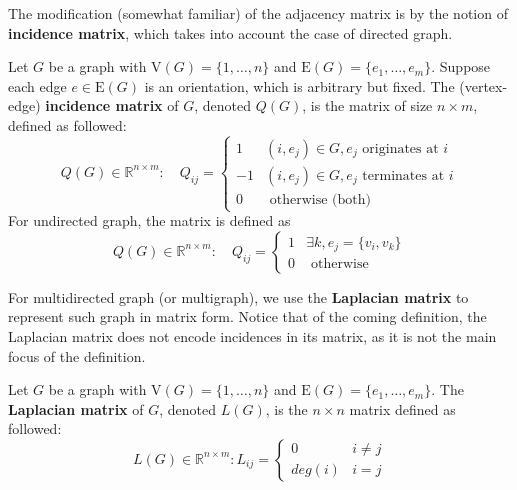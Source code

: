 The modification (somewhat familiar) of the adjacency matrix is by the notion of \textbf{incidence matrix}, which takes into account the case of directed graph.
\begin{definition}
    Let $G$ be a graph with $\mathrm{V}(G)=\{1,\dots,n\}$ and $\mathrm{E}(G)=\{e_1,\dots,e_m\}$. Suppose each edge $e\in \mathrm{E}(G)$ is an orientation, which is arbitrary but fixed. The (vertex-edge) \textbf{incidence matrix} of $G$, denoted $Q(G)$, is the matrix of size $n\times m$, defined as followed: 
    \begin{equation}
        Q(G) \in \mathbb{R}^{n\times m} : \quad Q_{ij} = \begin{cases}
            1 & (i, e_j)\in G, e_j \text{ originates at } i\\
            -1 & (i, e_j)\in G, e_j \text{ terminates at } i\\
            0 & \text{ otherwise (both)}
        \end{cases}
    \end{equation}
    For undirected graph, the matrix is defined as 
    \begin{equation}
        Q(G) \in \mathbb{R}^{n\times m} : \quad Q_{ij} = \begin{cases}
            1 & \exists k, e_j = \{v_i, v_k\}\\
            0 & \text{ otherwise}
        \end{cases}
    \end{equation}
\end{definition}

For multidirected graph (or multigraph), we use the \textbf{Laplacian matrix} to represent such graph in matrix form. Notice that of the coming definition, the Laplacian matrix does not encode incidences in its matrix, as it is not the main focus of the definition. 
\begin{definition}
    Let $G$ be a graph with $\mathrm{V}(G)=\{1,\dots,n\}$ and $\mathrm{E}(G)=\{e_1,\dots,e_m\}$. The \textbf{Laplacian matrix} of $G$, denoted $L(G)$, is the $n\times n$ matrix defined as followed: 
    \begin{equation}
        L(G)\in \mathbb{R}^{n\times m} : L_{ij} = \begin{cases}
            0 & i \neq j \\
            deg(i) & i = j
        \end{cases}
    \end{equation}
\end{definition}

